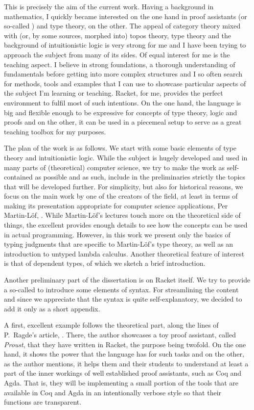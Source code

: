 This is precisely the aim of the current work. Having a background in
mathematics, I quickly became interested on the one hand in proof assistants
(or so-called ) and type theory, on the other.
The appeal of category theory mixed with (or, by some sources, morphed into)
topos theory, type theory and the background of intuitionistic logic is
very strong for me and I have been trying to approach the subject from
many of its sides. Of equal interest for me is the teaching aspect.
I believe in strong foundations, a thorough understanding of fundamentals
before getting into more complex structures and I so often search for
methods, tools and examples that I can use to showcase particular aspects
of the subject I'm learning or teaching. Racket, for me, provides the perfect
environment to fulfil most of such intentions. On the one hand, the language
is big and flexible enough to be expressive for concepts of type theory,
logic and proofs and on the other, it can be used in a piecemeal setup
to serve as a great teaching toolbox for my purposes.

The plan of the work is as follows. We start with some basic elements
of type theory and intuitionistic logic. While the subject is hugely developed
and used in many parts of (theoretical) computer science, we try to make
the work as self-contained as possible and as such, include in the preliminaries
strictly the topics that will be developed further. For simplicity, but also
for historical reasons, we focus on the main work by one of
the creators of the field, at least in terms of making its presentation
appropriate for computer science applications, Per Martin-L\"{o}f, \cite{mltt}.
While Martin-L\"{o}f's lectures touch more on the theoretical side of things,
the excellent \cite{pmltt} provides enough details to see how the concepts
can be used in actual programming. However, in this work we present
only the basics of typing judgments that are specific to Martin-L\"{o}f's
type theory, as well as an introduction to untyped lambda calculus. Another
theoretical feature of interest is that of dependent types, of which we sketch
a brief introduction.

Another preliminary part of the dissertation is on Racket itself.
We try to provide a so-called  to introduce some
elements of syntax. For streamlining the content and since we appreciate
that the syntax is quite self-explanatory, we decided to add it only as a
short appendix.

A first, excellent example follows the theoretical part, along the lines of P.\ Ragde's
article, \cite{proust}. There, the author showcases a toy proof assistant,
called \emph{Proust}, that they have written in Racket, the purpose being
twofold. On the one hand, it shows the power that the language has for
such tasks and on the other, as the author mentions, it helps them and
their students to understand at least a part of the inner workings of
well established proof assistants, such as Coq and Agda. That is, they
will be implementing a small portion of the tools that are available in
Coq and Agda in an intentionally verbose style so that their functions are
transparent.

